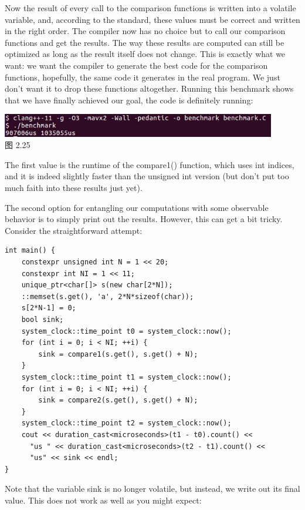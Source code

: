 Now the result of every call to the comparison functions is written into a volatile variable, and, according to the standard, these values must be correct and written in the right order. The compiler now has no choice but to call our comparison functions and get the results. The way these results are computed can still be optimized as long as the result itself does not change. This is exactly what we want: we want the compiler to generate the best code for the comparison functions, hopefully, the same code it generates in the real program. We just don't want it to drop these functions altogether. Running this benchmark shows that we have finally achieved our goal, the code is definitely running:

\begin{center}
\includegraphics[width=0.9\textwidth]{content/1/chapter2/images/25.jpg}\\
图 2.25
\end{center}

The first value is the runtime of the compare1() function, which uses int indices, and it is indeed slightly faster than the unsigned int version (but don't put too much faith into these results just yet).

The second option for entangling our computations with some observable behavior is to simply print out the results. However, this can get a bit tricky. Consider the straightforward attempt:

\begin{lstlisting}[style=styleCXX]
int main() {
	constexpr unsigned int N = 1 << 20;
	constexpr int NI = 1 << 11;
	unique_ptr<char[]> s(new char[2*N]);
	::memset(s.get(), 'a', 2*N*sizeof(char));
	s[2*N-1] = 0;
	bool sink;
	system_clock::time_point t0 = system_clock::now();
	for (int i = 0; i < NI; ++i) {
		sink = compare1(s.get(), s.get() + N);
	}
	system_clock::time_point t1 = system_clock::now();
	for (int i = 0; i < NI; ++i) {
		sink = compare2(s.get(), s.get() + N);
	}
	system_clock::time_point t2 = system_clock::now();
	cout << duration_cast<microseconds>(t1 - t0).count() <<
	  "us " << duration_cast<microseconds>(t2 - t1).count() <<
	  "us" << sink << endl;
}
\end{lstlisting}

Note that the variable sink is no longer volatile, but instead, we write out its final value. This does not work as well as you might expect:

